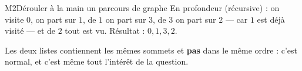\begin{fichemethode}{M2}{Dérouler à la main un parcours de graphe}
En profondeur (récursive) : on visite $0$, on part sur $1$, de $1$ on part sur $3$, de $3$ on
part sur $2$ — car $1$ est déjà visité — et de $2$ tout est vu. Résultat : $0, 1, 3, 2$.

Les deux listes contiennent les mêmes sommets et \textbf{pas} dans le même ordre : c'est
normal, et c'est même tout l'intérêt de la question.

%
%
%
%
%
%
%
%


\end{fichemethode}
